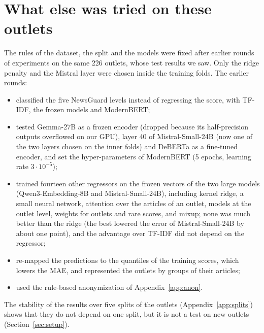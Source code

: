 \documentclass[11pt,a4paper]{article}
\begin{document}
\section{What else was tried on these outlets}\label{app:tried}
The rules of the dataset, the split and the models were fixed after earlier rounds of experiments on the same 226
outlets, whose test results we saw. Only the ridge penalty and the Mistral layer were chosen inside the training folds.
The earlier rounds:
\begin{itemize}
  \item classified the five NewsGuard levels instead of regressing the score, with TF-IDF, the frozen models and
        ModernBERT;
  \item tested Gemma-27B as a frozen encoder (dropped because its half-precision outputs overflowed on our GPU), layer 40
        of Mistral-Small-24B (now one of the two layers chosen on the inner folds) and DeBERTa as a fine-tuned encoder,
        and set the hyper-parameters of ModernBERT (5 epochs, learning rate $3 \cdot 10^{-5}$);
  \item trained fourteen other regressors on the frozen vectors of the two large models (Qwen3-Embedding-8B and
        Mistral-Small-24B), including
        kernel ridge, a small neural network, attention over the articles of an outlet, models at the outlet level,
        weights for outlets and rare scores, and mixup; none was much better than the ridge (the best lowered the error
        of Mistral-Small-24B by about one point), and the advantage over TF-IDF did not depend on the regressor;
  \item re-mapped the predictions to the quantiles of the training scores, which lowers the MAE, and represented the
        outlets by groups of their articles;
  \item used the rule-based anonymization of Appendix~\ref{app:anon}.
\end{itemize}
The stability of the results over five splits of the outlets (Appendix~\ref{app:splits}) shows that they do not depend
on one split, but it is not a test on new outlets (Section~\ref{sec:setup}).
\end{document}
